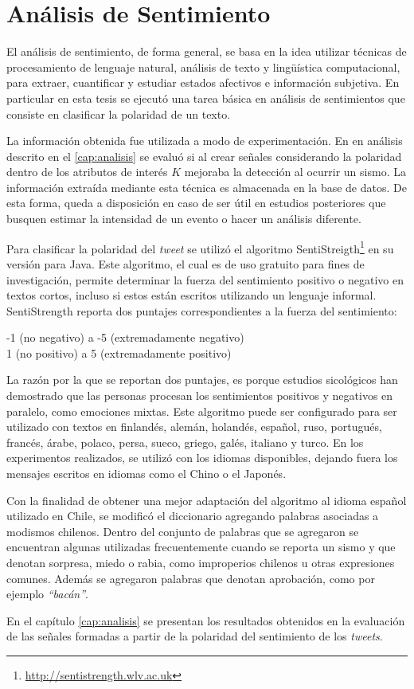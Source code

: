 \section{Análisis de Sentimiento}
\label{sec:sentimiento}

%
El análisis de sentimiento, de forma general, se basa en la idea utilizar técnicas de procesamiento de lenguaje natural, análisis de texto y lingüística computacional, para extraer, cuantificar y estudiar estados afectivos e información subjetiva. 
%
En particular en esta tesis se ejecutó una tarea básica en análisis de sentimientos que consiste en clasificar la polaridad de un texto.


La información obtenida fue utilizada a modo de experimentación. 
%
En en análisis descrito en el \ref{cap:analisis} se evaluó si al crear señales considerando la polaridad dentro de los atributos de interés $K$  mejoraba la detección al ocurrir un sismo. 
%
La información extraída mediante esta técnica es almacenada en la base de datos. 
%
De esta forma, queda a disposición en caso de ser útil en estudios posteriores que busquen estimar la intensidad de un evento o hacer un análisis diferente. 


Para clasificar la polaridad del \textit{tweet} se utilizó el algoritmo SentiStreigth\footnote{\url{http://sentistrength.wlv.ac.uk}} en su versión para Java. 
%
Este algoritmo, el cual es de uso gratuito para fines de investigación, permite determinar la fuerza del sentimiento positivo o negativo en textos cortos, incluso si estos están escritos utilizando un lenguaje informal. 
%
SentiStrength reporta dos puntajes correspondientes a la fuerza del sentimiento:

\begin{center}
-1 (no negativo) a -5 (extremadamente negativo)\\
1 (no positivo) a 5 (extremadamente positivo)
\end{center}

La razón por la que se reportan dos puntajes, es porque estudios sicológicos han demostrado que las personas procesan los sentimientos positivos y negativos en paralelo, como emociones mixtas.
%
Este algoritmo puede ser configurado para ser utilizado con textos en finlandés, alemán, holandés, español, ruso, portugués, francés, árabe, polaco, persa, sueco, griego, galés, italiano y turco. 
%
En los experimentos realizados, se utilizó con los idiomas disponibles, dejando fuera los mensajes escritos en idiomas como el Chino o el Japonés.


Con la finalidad de obtener una mejor adaptación del algoritmo al idioma español utilizado en Chile, se modificó el diccionario agregando palabras asociadas a modismos chilenos.
%
Dentro del conjunto de palabras que se agregaron se encuentran algunas utilizadas frecuentemente cuando se reporta un sismo y que denotan sorpresa, miedo o rabia, como improperios chilenos u otras expresiones comunes.
%
Además se agregaron palabras que denotan aprobación, como por ejemplo \textit{``bacán''}.

En el capítulo \ref{cap:analisis} se presentan los resultados obtenidos en la evaluación de las señales formadas a partir de la polaridad del sentimiento de los \textit{tweets}.



